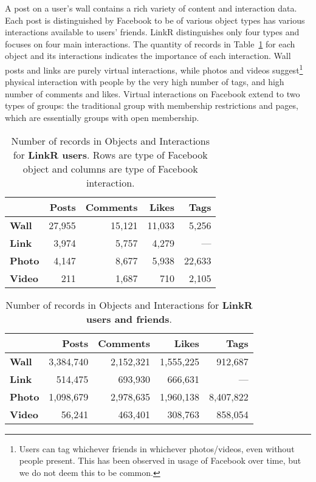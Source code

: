 \documentclass[letterpaper]{article}
\begin{document}
A post on a user's wall contains a rich variety of content and interaction data. Each post is distinguished by Facebook to be of various object types has various interactions available to users' friends. LinkR distinguishes only four types and focuses on four main interactions. The quantity of records in Table~\ref{tab:interactions:users} for each object and its interactions indicates the importance of each interaction. Wall posts and links are purely virtual interactions, while photos and videos suggest\footnote{Users can tag whichever friends in whichever photos/videos, even without people present. This has been observed in usage of Facebook over time, but we do not deem this to be common.} physical interaction with people by the very high number of tags, and high number of comments and likes. Virtual interactions on Facebook extend to two types of groups: the traditional group with membership restrictions and pages, which are essentially groups with open membership.




\begin{table}
\centering
\caption{\small Number of records in Objects and Interactions for \textbf{LinkR users}. Rows are type of Facebook object and columns are type of Facebook interaction.}
\label{tab:interactions:users}
\begin{tabular}{|>{\small}l|>{\small}r|>{\small}r|>{\small}r|>{\small}r|}
\hline
 & \textbf{Posts} & \textbf{Comments} & \textbf{Likes} & \textbf{Tags} \\
\hline
\textbf{Wall} & 27,955 & 15,121 & 11,033 & 5,256 \\
\hline
\textbf{Link} & 3,974 & 5,757 & 4,279 & --- \\
\hline
\textbf{Photo} & 4,147 & 8,677 & 5,938 & 22,633 \\
\hline
\textbf{Video} & 211 & 1,687 & 710 & 2,105 \\
\hline
\end{tabular}
\end{table}


\begin{table}
\centering
\caption{\small Number of records in Objects and Interactions for \textbf{LinkR users and friends}.}
\label{tab:interactions:usersfriends}
\begin{tabular}{|>{\small}l|>{\small}r|>{\small}r|>{\small}r|>{\small}r|}
\hline
 & \textbf{Posts} & \textbf{Comments} & \textbf{Likes} & \textbf{Tags} \\
\hline
\textbf{Wall} & 3,384,740 & 2,152,321 & 1,555,225 & 912,687 \\
\hline
\textbf{Link} & 514,475 & 693,930 & 666,631 & --- \\
\hline
\textbf{Photo} & 1,098,679 & 2,978,635 & 1,960,138 & 8,407,822 \\
\hline
\textbf{Video} & 56,241 & 463,401 & 308,763 & 858,054 \\
\hline
\end{tabular}
\end{table}
\end{document}
